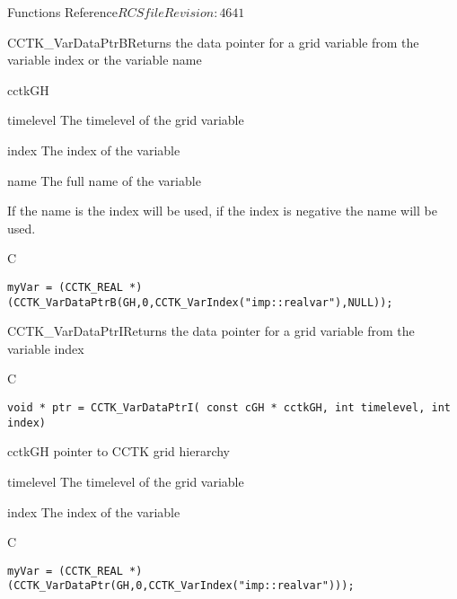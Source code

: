 \begin{cactuspart}{ Functions Reference}{$RCSfile$}{$Revision: 4641 $}
\begin{FunctionDescription}{CCTK\_VarDataPtrB}{Returns the data pointer for a grid variable from the variable index or the variable name}
\begin{ParameterSection}
\begin{Parameter}{cctkGH}
\end{Parameter}
\begin{Parameter}{timelevel}
The timelevel of the grid variable
\end{Parameter}
\begin{Parameter}{index}
The index of the variable
\end{Parameter}
\begin{Parameter}{name}
The full name of the variable
\end{Parameter}
\end{ParameterSection}
\begin{Discussion}
If the name is  the index will be used, if the index is negative the name will be used.
\end{Discussion}
\begin{ExampleSection}
\begin{Example}{C}
\begin{verbatim}
myVar = (CCTK_REAL *)(CCTK_VarDataPtrB(GH,0,CCTK_VarIndex("imp::realvar"),NULL));
\end{verbatim}
\end{Example}
\end{ExampleSection}
\end{FunctionDescription}


\begin{FunctionDescription}{CCTK\_VarDataPtrI}{Returns the data pointer for a grid variable from the variable index}
\label{CCTK-VarDataPtrI}
\begin{SynopsisSection}
\begin{Synopsis}{C}
\begin{verbatim}void * ptr = CCTK_VarDataPtrI( const cGH * cctkGH, int timelevel, int index)\end{verbatim}
\end{Synopsis}
\end{SynopsisSection}
\begin{ParameterSection}
\begin{Parameter}{cctkGH}
pointer to CCTK grid hierarchy
\end{Parameter}
\begin{Parameter}{timelevel}
The timelevel of the grid variable
\end{Parameter}
\begin{Parameter}{index}
The index of the variable
\end{Parameter}
\end{ParameterSection}

\begin{ExampleSection}
\begin{Example}{C}
\begin{verbatim}
myVar = (CCTK_REAL *)(CCTK_VarDataPtr(GH,0,CCTK_VarIndex("imp::realvar")));
\end{verbatim}
\end{Example}
\end{ExampleSection}
\end{FunctionDescription}



\end{cactuspart}
